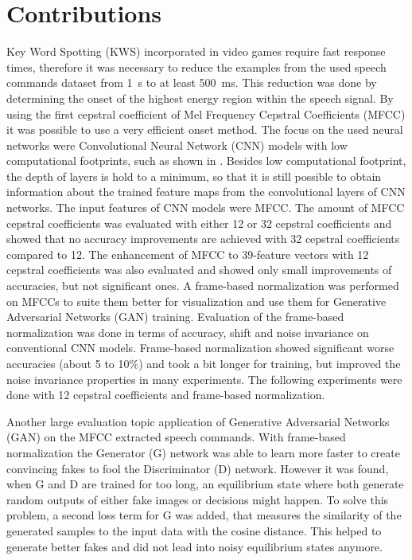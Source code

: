 
\section{Contributions}
\thesisStateNew
Key Word Spotting (KWS) incorporated in video games require fast response times, therefore it was necessary to reduce the examples from the used speech commands dataset \cite{Warden2018} from \SI{1}{\second} to at least \SI{500}{\milli\second}.
This reduction was done by determining the onset of the highest energy region within the speech signal.
By using the first cepstral coefficient of Mel Frequency Cepstral Coefficients (MFCC) it was possible to use a very efficient onset method.
The focus on the used neural networks were Convolutional Neural Network (CNN) models with low computational footprints, such as shown in \cite{Sainath2015}.
Besides low computational footprint, the depth of layers is hold to a minimum, so that it is still possible to obtain information about the trained feature maps from the convolutional layers of CNN networks.
The input features of CNN models were MFCC.
The amount of MFCC cepstral coefficients was evaluated with either 12 or 32 cepstral coefficients and showed that no accuracy improvements are achieved with 32 cepstral coefficients compared to 12.
The enhancement of MFCC to 39-feature vectors with 12 cepstral coefficients was also evaluated and showed only small improvements of accuracies, but not significant ones.
A frame-based normalization was performed on MFCCs to suite them better for visualization and use them for Generative Adversarial Networks (GAN) training.
Evaluation of the frame-based normalization was done in terms of accuracy, shift and noise invariance on conventional CNN models.
Frame-based normalization showed significant worse accuracies (about 5 to 10\%) and took a bit longer for training, but improved the noise invariance properties in many experiments.
The following experiments were done with 12 cepstral coefficients and frame-based normalization.

Another large evaluation topic application of Generative Adversarial Networks (GAN) on the MFCC extracted speech commands. 
With frame-based normalization the Generator (G) network was able to learn more faster to create convincing fakes to fool the Discriminator (D) network.
However it was found, when G and D are trained for too long, an equilibrium state where both generate random outputs of either fake images or decisions might happen.
To solve this problem, a second loss term for G was added, that measures the similarity of the generated samples to the input data with the cosine distance.
This helped to generate better fakes and did not lead into noisy equilibrium states anymore.

